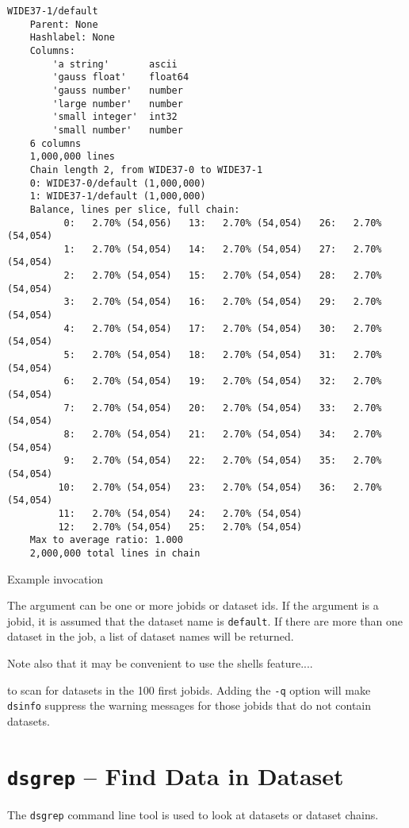 \begin{verbatim}
WIDE37-1/default
    Parent: None
    Hashlabel: None
    Columns:
        'a string'       ascii
        'gauss float'    float64
        'gauss number'   number
        'large number'   number
        'small integer'  int32
        'small number'   number
    6 columns
    1,000,000 lines
    Chain length 2, from WIDE37-0 to WIDE37-1
    0: WIDE37-0/default (1,000,000)
    1: WIDE37-1/default (1,000,000)
    Balance, lines per slice, full chain:
          0:   2.70% (54,056)   13:   2.70% (54,054)   26:   2.70% (54,054)
          1:   2.70% (54,054)   14:   2.70% (54,054)   27:   2.70% (54,054)
          2:   2.70% (54,054)   15:   2.70% (54,054)   28:   2.70% (54,054)
          3:   2.70% (54,054)   16:   2.70% (54,054)   29:   2.70% (54,054)
          4:   2.70% (54,054)   17:   2.70% (54,054)   30:   2.70% (54,054)
          5:   2.70% (54,054)   18:   2.70% (54,054)   31:   2.70% (54,054)
          6:   2.70% (54,054)   19:   2.70% (54,054)   32:   2.70% (54,054)
          7:   2.70% (54,054)   20:   2.70% (54,054)   33:   2.70% (54,054)
          8:   2.70% (54,054)   21:   2.70% (54,054)   34:   2.70% (54,054)
          9:   2.70% (54,054)   22:   2.70% (54,054)   35:   2.70% (54,054)
         10:   2.70% (54,054)   23:   2.70% (54,054)   36:   2.70% (54,054)
         11:   2.70% (54,054)   24:   2.70% (54,054)
         12:   2.70% (54,054)   25:   2.70% (54,054)
    Max to average ratio: 1.000
    2,000,000 total lines in chain
\end{verbatim}


Example invocation
\begin{shell}
\end{shell}
The argument can be one or more jobids or dataset ids.  If the
argument is a jobid, it is assumed that the dataset name is
\texttt{default}.  If there are more than one dataset in the job, a
list of dataset names will be returned.


Note also that it may be convenient to use the shells feature....
\begin{shell}
\end{shell}
to scan for datasets in the 100 first jobids.  Adding the \texttt{-q}
option will make \texttt{dsinfo} suppress the warning messages for
those jobids that do not contain datasets.




\section{\texttt{dsgrep} -- Find Data in Dataset}
The \texttt{dsgrep} command line tool is used to look at datasets or
dataset chains.
